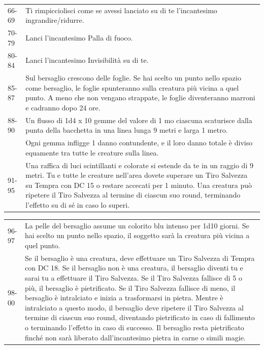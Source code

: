 \begin{multicols}{2}
\begin{tabularx}{0.50\textwidth}{lX}
66-69 &Ti rimpicciolisci come se avessi lanciato su di te l'incantesimo ingrandire/ridurre.\\
70-79 &Lanci l'incantesimo Palla di fuoco.\\
80-84 &Lanci l'incantesimo Invisibilità su di te.\\
85-87 &Sul bersaglio crescono delle foglie. Se hai scelto un punto nello spazio come bersaglio, le foglie spunteranno sulla creatura più vicina a quel punto. A meno che non vengano strappate, le foglie diventeranno marroni e cadranno dopo 24 ore.\\
88-90& Un flusso di 1d4 x 10 gemme del valore di 1 mo ciascuna scaturisce dalla punta della bacchetta in una linea lunga 9 metri e larga 1 metro.\\
& Ogni gemma infligge 1 danno contundente, e il loro danno totale è diviso equamente tra tutte le creature sulla linea.\\
91-95 &Una raffica di luci scintillanti e colorate si estende da te in un raggio di 9 metri. Tu e tutte le creature nell'area dovete superare un Tiro Salvezza su Tempra con DC 15 o restare accecati per 1 minuto. Una creatura può ripetere il Tiro Salvezza al termine di ciascun suo round, terminando l'effetto su di sé in caso lo superi.\\
\end{tabularx}
\noindent\begin{tabularx}{0.50\textwidth}{lX}
96-97 &La pelle del bersaglio assume un colorito blu intenso per 1d10 giorni. Se hai scelto un punto nello spazio, il soggetto sarà la creatura più vicina a quel punto.\\
98-00 &Se il bersaglio è una creatura, deve effettuare un Tiro Salvezza di Tempra con DC 18. Se il bersaglio non è una creatura, il bersaglio diventi tu e sarai tu a effettuare il Tiro Salvezza. Se il Tiro Salvezza fallisce di 5 o più, il bersaglio è pietrificato. Se il Tiro Salvezza fallisce di meno, il bersaglio è intralciato e inizia a trasformarsi in pietra. Mentre è intralciato a questo modo, il bersaglio deve ripetere il Tiro Salvezza al termine di ciascun suo round, diventando pietrificato in caso di fallimento o terminando l'effetto in caso di successo. Il bersaglio resta pietrificato finché non sarà liberato dall'incantesimo pietra in carne o simili magie.\\
\end{tabularx}




\end{multicols}
